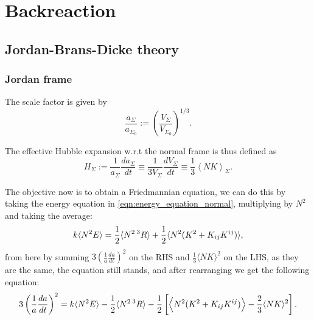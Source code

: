 \chapter{Backreaction}


\section{Jordan-Brans-Dicke theory}

\subsection{Jordan frame}

The scale factor is given by
\begin{equation}
    \frac{a_\Sigma}{a_{\Sigma_0}}:=\left(\frac{V_\Sigma}{V_{\Sigma_0}}\right)^{1/3}.
\end{equation}

The effective Hubble expansion w.r.t the normal frame is thus defined as
\begin{equation}
    H_{\Sigma} := \frac{1}{a_{\Sigma}}\frac{da_{\Sigma}}{dt}\equiv \frac{1}{3V_{\Sigma}}\frac{dV_{\Sigma}}{dt}\equiv\frac{1}{3}\left\langle NK \right\rangle_{\Sigma}.
    \label{eqn:def_scale_factor_normal}
\end{equation}



The objective now is to obtain a Friedmannian equation, we can do this by taking the energy equation in \cref{eqn:energy_equation_normal}, multiplying by $N^2$ and taking the average:
\begin{equation}
    k\langle N^2E\rangle=\frac{1}{2}\langle N^2\prescript{3}{}{R}\rangle+\frac{1}{2}\langle N^2(K^2+K_{ij}K^{ij})\rangle,
\end{equation}
from here by summing $3\left(\frac{1}{a}\frac{da}{dt}\right)^2$ on the RHS and $\frac{1}{3}\langle NK\rangle^2$ on the LHS, as they are the same, the equation still stands, and after rearranging we get the following equation:
\begin{equation}
    3\left(\frac{1}{a}\frac{da}{dt}\right)^2=k\langle N^2E\rangle-\frac{1}{2}\langle N^2\prescript{3}{}{R}\rangle-\frac{1}{2}\left[\left\langle N^2(K^2+K_{ij}K^{ij})\right\rangle-\frac{2}{3}\langle NK\rangle^2\right].
\end{equation}



